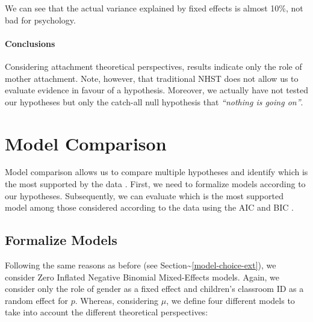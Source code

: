 \documentclass[
]{book}
\begin{document}
We can see that the actual variance explained by fixed effects is almost 10\%, not bad for psychology.

\hypertarget{conclusions}{%
\subsubsection*{Conclusions}\label{conclusions}}

Considering attachment theoretical perspectives, results indicate only the role of mother attachment. Note, however, that traditional NHST does not allow us to evaluate evidence in favour of a hypothesis. Moreover, we actually have not tested our hypotheses but only the catch-all null hypothesis that \emph{``nothing is going on''}.

\hypertarget{model-comparison-ext}{%
\chapter{Model Comparison}\label{model-comparison-ext}}

Model comparison allows us to compare multiple hypotheses and identify which is the most supported by the data \citep{mcelreathStatisticalRethinkingBayesian2020}. First, we need to formalize models according to our hypotheses. Subsequently, we can evaluate which is the most supported model among those considered according to the data using the AIC and BIC \citep{wagenmakersAICModelSelection2004, akaike1973a, schwarzEstimatingDimensionModel1978}.

\hypertarget{formalize-models}{%
\section{Formalize Models}\label{formalize-models}}

Following the same reasons as before (see Section\textasciitilde\ref{model-choice-ext}), we consider Zero Inflated Negative Binomial Mixed-Effects models. Again, we consider only the role of gender as a fixed effect and children's classroom ID as a random effect for \(p\). Whereas, considering \(\mu\), we define four different models to take into account the different theoretical perspectives:
\end{document}
